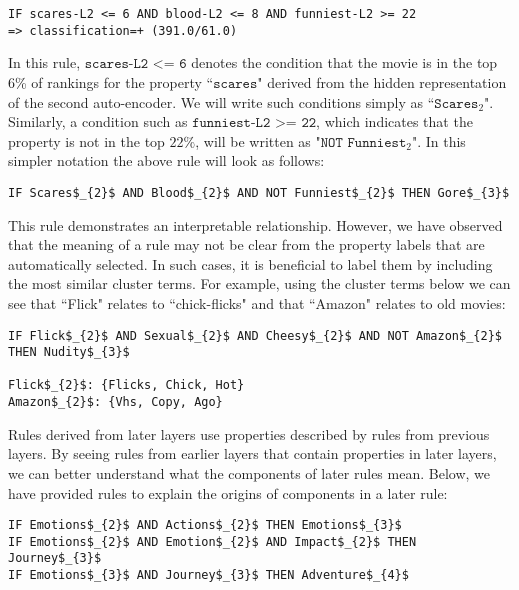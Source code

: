 \begin{lstlisting}[mathescape=true]
IF scares-L2 <= 6 AND blood-L2 <= 8 AND funniest-L2 >= 22
=> classification=+ (391.0/61.0)
\end{lstlisting}

\noindent In this rule, $\texttt{scares-L2 <= 6}$ denotes the condition that the movie is in the top 6\% of rankings for the property ``$\texttt{scares}$" derived from the hidden representation of the second auto-encoder. We will write such conditions simply as ``$\texttt{Scares$_{2}$}$". Similarly, a condition such as $\texttt{funniest-L2 >= 22}$, which indicates that the property is not in the top $22\%$, will be written as "$\texttt{NOT Funniest}$$_{2}$". In this simpler notation the above rule will look as follows: %

\begin{lstlisting}[mathescape=true]
IF Scares$_{2}$ AND Blood$_{2}$ AND NOT Funniest$_{2}$ THEN Gore$_{3}$
\end{lstlisting}

This rule demonstrates an interpretable relationship. However, we have observed that the meaning of a rule may not be clear from the property labels that are automatically selected. In such cases, it is beneficial to label them by including the most similar cluster terms. For example, using the cluster terms below we can see that ``Flick" relates to ``chick-flicks" and that ``Amazon" relates to old movies:

\begin{lstlisting}[mathescape=true]
IF Flick$_{2}$ AND Sexual$_{2}$ AND Cheesy$_{2}$ AND NOT Amazon$_{2}$ THEN Nudity$_{3}$

Flick$_{2}$: {Flicks, Chick, Hot}
Amazon$_{2}$: {Vhs, Copy, Ago}
\end{lstlisting}

Rules derived from later layers use properties described by rules from previous layers. By seeing rules from earlier layers that contain properties in later layers, we can better understand what the components of later rules mean. Below, we have provided rules to explain the origins of components in a later rule:

\begin{lstlisting}[mathescape=true]
IF Emotions$_{2}$ AND Actions$_{2}$ THEN Emotions$_{3}$ 
IF Emotions$_{2}$ AND Emotion$_{2}$ AND Impact$_{2}$ THEN Journey$_{3}$ 
IF Emotions$_{3}$ AND Journey$_{3}$ THEN Adventure$_{4}$ 
\end{lstlisting}

